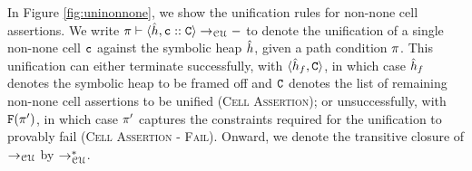 In Figure \ref{fig:uninonnone}, we show the unification rules for non-none cell assertions. 
We write $\pi \vdash \langle \hat{h}, \mathtt{c} :: \mathtt{C} \rangle \rightarrow_{\cal CU} -$ to denote the unification of a single non-none cell $\mathtt{c}$ against the symbolic heap $\hat{h}$, given a path condition $\pi$. This unification can either terminate
successfully, with $\langle \hat{h}_f, \mathtt{C} \rangle$, in which case $\hat{h}_f$ denotes the
symbolic heap to be framed off and $\mathtt{C}$ denotes the list of remaining non-none cell assertions to be unified (\textsc{Cell Assertion}); or unsuccessfully, with ${\mathtt{F}}(\pi')$, 
in which case $\pi'$ captures the constraints required for the unification to provably fail (\textsc{Cell Assertion - Fail}).
%   
Onward, we denote the transitive closure of $\rightarrow_{\cal CU}$ by $\rightarrow_{\cal CU}^*$. 

